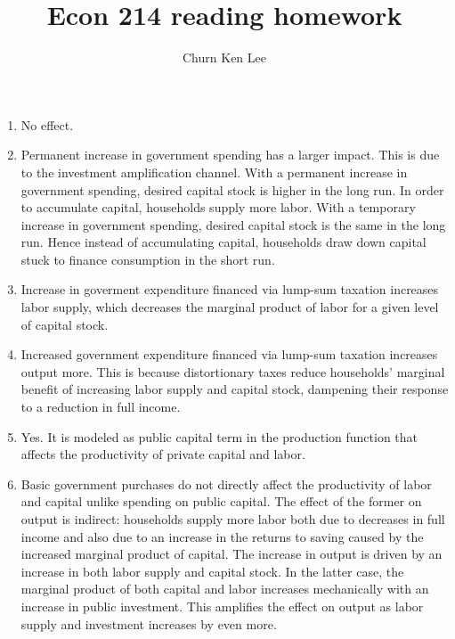\documentclass[12pt]{article}
\title{Econ 214 reading homework}
\author{Churn Ken Lee}
\date{}
\begin{document}
\maketitle

\section{\cite{baxter_king_1993}}
\begin{enumerate}
    \item No effect.
    \item Permanent increase in government spending has a larger impact. 
    This is due to the investment amplification channel. 
    With a permanent increase in government spending, desired capital stock is higher in the long run.
    In order to accumulate capital, households supply more labor.
    With a temporary increase in government spending, desired capital stock is the same in the long run.
    Hence instead of accumulating capital, households draw down capital stuck to finance consumption in the short run.
    \item Increase in goverment expenditure financed via lump-sum taxation increases labor supply, which decreases the marginal product of labor for a given level of capital stock.
    \item Increased government expenditure financed via lump-sum taxation increases output more. This is because distortionary taxes reduce households' marginal benefit of increasing labor supply and capital stock, dampening their response to a reduction in full income.
    \item Yes.
    It is modeled as public capital term in the production function that affects the productivity of private capital and labor.
    \item Basic government purchases do not directly affect the productivity of labor and capital unlike spending on public capital.
    The effect of the former on output is indirect: households supply more labor both due to decreases in full income and also due to an increase in the returns to saving caused by the increased marginal product of capital.
    The increase in output is driven by an increase in both labor supply and capital stock.
    In the latter case, the marginal product of both capital and labor increases mechanically with an increase in public investment.
    This amplifies the effect on output as labor supply and investment increases by even more.
\end{enumerate}
\end{document}
